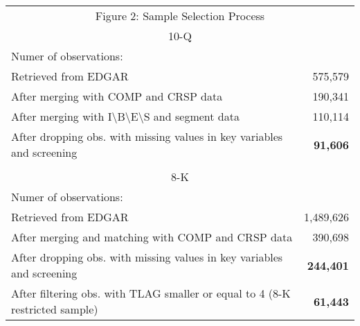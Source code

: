 \begin{table}[htbp] \label{fig2}
  \centering
    \begin{tabular}{lr}
    \multicolumn{2}{c}{Figure 2: Sample Selection Process} \\
    \multicolumn{2}{c}{10-Q} \\
    Numer of observations: &  \\
    Retrieved from EDGAR & 575,579 \\
    After merging with COMP and CRSP data & 190,341 \\
    After merging with I\textbackslash{}B\textbackslash{}E\textbackslash{}S and segment data & 110,114 \\
    After dropping obs. with missing values in key variables and screening & \textbf{91,606} \\
      &  \\
    \multicolumn{2}{c}{8-K} \\
    Numer of observations: &  \\
    Retrieved from EDGAR & 1,489,626 \\
    After merging and matching with COMP and CRSP data & 390,698 \\
    After dropping obs. with missing values in key variables and screening & \textbf{244,401} \\
    After filtering obs. with TLAG smaller or equal to 4 (8-K restricted sample) & \textbf{61,443} \\
    \end{tabular}%
\end{table}%
